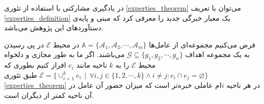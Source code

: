 در یادگیری مشارکتی با استفاده از تئوری
\ref{experties_theorem}
می‌توان با تعریف
\ref{experties_definition}
یک معیار خبرگی جدید را معرفی کرد که مبنی و پایه‌ی دستآوردهای این پژوهش می‌باشد.

\begin{definition}\setstretch{\thebaselinestretch}\label{experties_definition}
فرض می‌کنیم مجموعه‌ای از عامل‌ها
$\mathbb{A} = \{\mathcal{A}_1, \mathcal{A}_2, \cdots, \mathcal{A}_m\}$
در محیط $\mathcal{E}$ در پی رسیدن به یک مجموعه اهداف
$\mathcal{G} \subseteq \{g_1, g_2, \cdots, g_n\}$
می‌باشند. اگر ما به طور مجازی و دلخواه محیط $\mathcal{E}$ را به $k$ ناحیه‌ مانند $e_i$ افراز کنیم بطوری که
$\mathcal{E} = \{\cup_{i=1}^{k} e_i\hspace{5pt}|\hspace{5pt}\forall i,j\in\{1,2,\cdots,k\} \land i \neq j : e_i \cap e_j = \varnothing\}$
طبق تئوری
\ref{experties_theorem}
در هر ناحیه $i$ام عاملی خبره‌تر است که میزان حضور آن عامل در آن ناحیه کمتر از دیگران است.
\end{definition}

